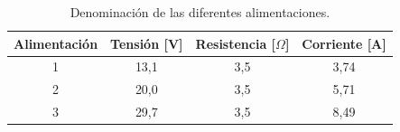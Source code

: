 \newpage


\begin{table}[H]
    \centering
    \setlength{\tabcolsep}{5pt}
    \renewcommand{\arraystretch}{1.2}
    \begin{tabular}{|c|c|c|c|}
        \hline
        \textbf{Alimentación} & \textbf{Tensión [V]} & \textbf{Resistencia [\(\Omega\)]} & \textbf{Corriente [A]}\\
        \hline
        1 & 13,1 & 3,5 & 3,74 \\
        2 & 20,0 & 3,5 & 5,71 \\
        3 & 29,7 & 3,5 & 8,49\\
        \hline
    \end{tabular}
    \caption{Denominación de las diferentes alimentaciones.}
    \label{tab:alimentacionesBase}
\end{table}

